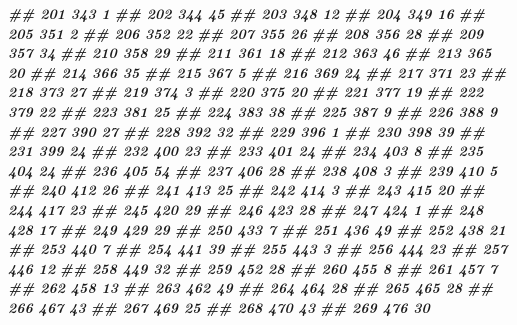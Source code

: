 \documentclass[
]{book}
\newenvironment{Shaded}{\begin{snugshade}}{\end{snugshade}}
\newcommand{\DocumentationTok}[1]{\textcolor[rgb]{0.56,0.35,0.01}{\textbf{\textit{#1}}}}
\theoremstyle{definition}
\theoremstyle{definition}
\theoremstyle{definition}
\theoremstyle{definition}
\theoremstyle{remark}
\begin{document}
\begin{Shaded}
\begin{Highlighting}[]
\DocumentationTok{\#\# 201    343  1}
\DocumentationTok{\#\# 202    344 45}
\DocumentationTok{\#\# 203    348 12}
\DocumentationTok{\#\# 204    349 16}
\DocumentationTok{\#\# 205    351  2}
\DocumentationTok{\#\# 206    352 22}
\DocumentationTok{\#\# 207    355 26}
\DocumentationTok{\#\# 208    356 28}
\DocumentationTok{\#\# 209    357 34}
\DocumentationTok{\#\# 210    358 29}
\DocumentationTok{\#\# 211    361 18}
\DocumentationTok{\#\# 212    363 46}
\DocumentationTok{\#\# 213    365 20}
\DocumentationTok{\#\# 214    366 35}
\DocumentationTok{\#\# 215    367  5}
\DocumentationTok{\#\# 216    369 24}
\DocumentationTok{\#\# 217    371 23}
\DocumentationTok{\#\# 218    373 27}
\DocumentationTok{\#\# 219    374  3}
\DocumentationTok{\#\# 220    375 20}
\DocumentationTok{\#\# 221    377 19}
\DocumentationTok{\#\# 222    379 22}
\DocumentationTok{\#\# 223    381 25}
\DocumentationTok{\#\# 224    383 38}
\DocumentationTok{\#\# 225    387  9}
\DocumentationTok{\#\# 226    388  9}
\DocumentationTok{\#\# 227    390 27}
\DocumentationTok{\#\# 228    392 32}
\DocumentationTok{\#\# 229    396  1}
\DocumentationTok{\#\# 230    398 39}
\DocumentationTok{\#\# 231    399 24}
\DocumentationTok{\#\# 232    400 23}
\DocumentationTok{\#\# 233    401 24}
\DocumentationTok{\#\# 234    403  8}
\DocumentationTok{\#\# 235    404 24}
\DocumentationTok{\#\# 236    405 54}
\DocumentationTok{\#\# 237    406 28}
\DocumentationTok{\#\# 238    408  3}
\DocumentationTok{\#\# 239    410  5}
\DocumentationTok{\#\# 240    412 26}
\DocumentationTok{\#\# 241    413 25}
\DocumentationTok{\#\# 242    414  3}
\DocumentationTok{\#\# 243    415 20}
\DocumentationTok{\#\# 244    417 23}
\DocumentationTok{\#\# 245    420 29}
\DocumentationTok{\#\# 246    423 28}
\DocumentationTok{\#\# 247    424  1}
\DocumentationTok{\#\# 248    428 17}
\DocumentationTok{\#\# 249    429 29}
\DocumentationTok{\#\# 250    433  7}
\DocumentationTok{\#\# 251    436 49}
\DocumentationTok{\#\# 252    438 21}
\DocumentationTok{\#\# 253    440  7}
\DocumentationTok{\#\# 254    441 39}
\DocumentationTok{\#\# 255    443  3}
\DocumentationTok{\#\# 256    444 23}
\DocumentationTok{\#\# 257    446 12}
\DocumentationTok{\#\# 258    449 32}
\DocumentationTok{\#\# 259    452 28}
\DocumentationTok{\#\# 260    455  8}
\DocumentationTok{\#\# 261    457  7}
\DocumentationTok{\#\# 262    458 13}
\DocumentationTok{\#\# 263    462 49}
\DocumentationTok{\#\# 264    464 28}
\DocumentationTok{\#\# 265    465 28}
\DocumentationTok{\#\# 266    467 43}
\DocumentationTok{\#\# 267    469 25}
\DocumentationTok{\#\# 268    470 43}
\DocumentationTok{\#\# 269    476 30}

\end{Highlighting}
\end{Shaded}
\end{document}

